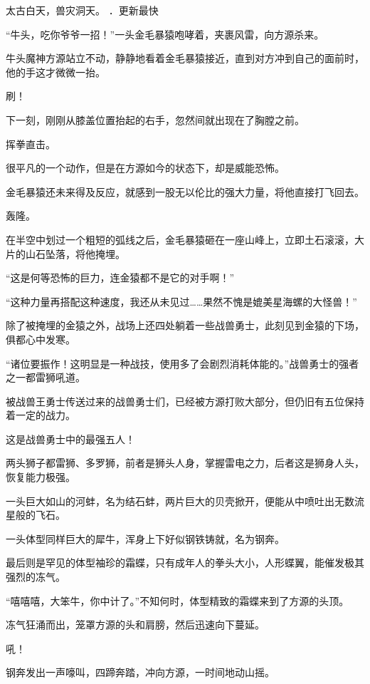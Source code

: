 
\begin{this_body}

太古白天，兽灾洞天。 ．更新最快

“牛头，吃你爷爷一招！”一头金毛暴猿咆哮着，夹裹风雷，向方源杀来。

牛头魔神方源站立不动，静静地看着金毛暴猿接近，直到对方冲到自己的面前时，他的手这才微微一抬。

刷！

下一刻，刚刚从膝盖位置抬起的右手，忽然间就出现在了胸膛之前。

挥拳直击。

很平凡的一个动作，但是在方源如今的状态下，却是威能恐怖。

金毛暴猿还未来得及反应，就感到一股无以伦比的强大力量，将他直接打飞回去。

轰隆。

在半空中划过一个粗短的弧线之后，金毛暴猿砸在一座山峰上，立即土石滚滚，大片的山石坠落，将他掩埋。

“这是何等恐怖的巨力，连金猿都不是它的对手啊！”

“这种力量再搭配这种速度，我还从未见过……果然不愧是媲美星海螺的大怪兽！”

除了被掩埋的金猿之外，战场上还四处躺着一些战兽勇士，此刻见到金猿的下场，俱都心中发寒。

“诸位要振作！这明显是一种战技，使用多了会剧烈消耗体能的。”战兽勇士的强者之一都雷狮吼道。

被战兽王勇士传送过来的战兽勇士们，已经被方源打败大部分，但仍旧有五位保持着一定的战力。

这是战兽勇士中的最强五人！

两头狮子都雷狮、多罗狮，前者是狮头人身，掌握雷电之力，后者这是狮身人头，恢复能力极强。

一头巨大如山的河蚌，名为结石蚌，两片巨大的贝壳掀开，便能从中喷吐出无数流星般的飞石。

一头体型同样巨大的犀牛，浑身上下好似钢铁铸就，名为钢奔。

最后则是罕见的体型袖珍的霜蝶，只有成年人的拳头大小，人形蝶翼，能催发极其强烈的冻气。

“嘻嘻嘻，大笨牛，你中计了。”不知何时，体型精致的霜蝶来到了方源的头顶。

冻气狂涌而出，笼罩方源的头和肩膀，然后迅速向下蔓延。

吼！

钢奔发出一声嚎叫，四蹄奔踏，冲向方源，一时间地动山摇。


\end{this_body}
